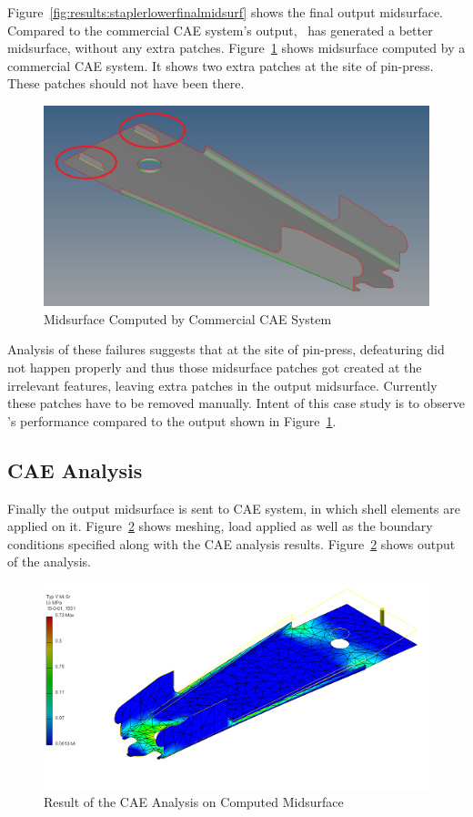 
Figure~\ref{fig:results:staplerlowerfinalmidsurf} shows the final output midsurface. Compared to the commercial CAE system's output, \mysystemname~has generated a better midsurface, without any extra patches. Figure~\ref{fig:results:staplerlowerhm} shows midsurface computed by a commercial CAE system. It shows two extra patches at the site of pin-press. These patches should not have been there.


\begin{figure}[!h]
\centering     %
\includegraphics[width=0.62\linewidth,valign=t]{images/StaplerLower_HMFails_EmbossPin_1_model}
\caption{Midsurface Computed by Commercial CAE System}
\label{fig:results:staplerlowerhm}
\end{figure}





Analysis of these failures suggests that at the site of pin-press, defeaturing did not happen properly and thus those midsurface patches got created at the irrelevant features, leaving extra patches in the output midsurface. Currently these patches have to be removed manually. Intent of this case study is to observe \mysystemname's performance compared to the output shown in Figure~\ref{fig:results:staplerlowerhm}.

\subsection{CAE Analysis}

Finally the output midsurface is sent to CAE system, in which shell elements are applied on it. Figure~\ref{fig:results:staplerlowercae} shows meshing, load applied as well as the boundary conditions specified along with the CAE analysis results. Figure~\ref{fig:results:staplerlowercae} shows output of the analysis.



\begin{figure}[!h]
\centering     %
\includegraphics[width=0.62\linewidth,valign=t]{images/StaplerLower_cae_model}
\caption{Result of the CAE Analysis on Computed Midsurface}
\label{fig:results:staplerlowercae}
\end{figure}

